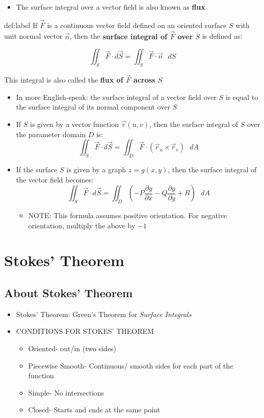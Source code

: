 \documentclass{package/notes}
\begin{document}
\begin{itemize}
	\item The surface integral over a vector field is also known as \textbf{flux}
\end{itemize}

\begin{definition}[Flux]{def:label}
	If $\vec{F}$ is a continuous vector field defined on an oriented surface $S$ with unit normal vector $\vec{n}$, then the \textbf{surface integral of $\vec{F}$ over $S$} is defined as:

	$$\iint_S \vec{F} \cdot d\vec{S} = \iint_S \vec{F} \cdot \vec{n} \text{ }dS$$

	This integral is also called the \textbf{flux of $\vec{F}$ across $S$}
\end{definition}

\begin{itemize}
	\item In more English-speak: the surface integral of a vector field over $S$ is equal to the surface integral of its normal component over $S$
	\item If $S$ is given by a vector function $\vec{r}(u,v)$, then the surface integral of $S$ over the parameter domain $D$ is: $$\iint_S\vec{F}\cdot d\vec{S}=\iint_D \vec{F} \cdot (\vec{r}_u \times \vec{r}_v) \text{ }dA$$
	\item If the surface $S$ is given by a graph $z=g(x,y)$, then the surface integral of the vector field becomes: $$\iint_S \vec{F} \cdot d\vec{S} = \iint_D(-P\frac{\partial{g}}{\partial{x}} - Q\frac{\partial{g}}{\partial{y}}+R)\text{ }dA$$
	\begin{itemize}
		\item NOTE: This formula assumes positive orientation. For negative orientation, multiply the above by $-1$
	\end{itemize}
\end{itemize}




\section{Stokes' Theorem}


\subsection{About Stokes' Theorem}

\begin{itemize}
	\item Stokes' Theorem: Green's Theorem for \textit{Surface Integrals}
	\item CONDITIONS FOR STOKES' THEOREM
	\begin{itemize}
		\item Oriented- out/in (two sides)
		\item Piecewise Smooth- Continuous/ smooth sides for each part of the function
		\item Simple- No intersections
		\item Closed- Starts and ends at the same point
	\end{itemize}
\end{itemize}
\end{document}
